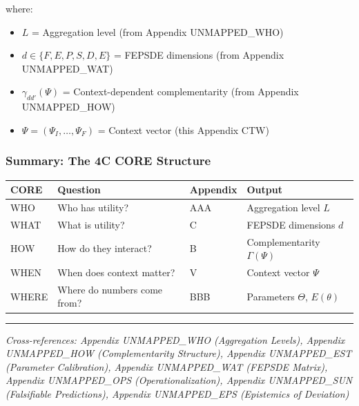 where:
\begin{itemize}
    \item $L$ = Aggregation level (from Appendix UNMAPPED_WHO)
    \item $d \in \{F, E, P, S, D, E\}$ = FEPSDE dimensions (from Appendix UNMAPPED_WAT)
    \item $\gamma_{dd'}(\Psi)$ = Context-dependent complementarity (from Appendix UNMAPPED_HOW)
    \item $\Psi = (\Psi_I, \ldots, \Psi_F)$ = Context vector (this Appendix CTW)
\end{itemize}

\subsubsection{Summary: The 4C CORE Structure}

\begin{center}
\begin{tabular}{llll}
\toprule
\textbf{CORE} & \textbf{Question} & \textbf{Appendix} & \textbf{Output} \\
\midrule
WHO & Who has utility? & AAA & Aggregation level $L$ \\
WHAT & What is utility? & C & FEPSDE dimensions $d$ \\
HOW & How do they interact? & B & Complementarity $\Gamma(\Psi)$ \\
WHEN & When does context matter? & V & Context vector $\Psi$ \\
WHERE & Where do numbers come from? & BBB & Parameters $\Theta$, $E(\theta)$ \\
\bottomrule
\end{tabular}
\end{center}

\vspace{0.5em}
\hrule
\vspace{0.5em}
\noindent\textit{Cross-references: Appendix UNMAPPED_WHO (Aggregation Levels), 
Appendix UNMAPPED_HOW (Complementarity Structure), Appendix UNMAPPED_EST (Parameter Calibration),
Appendix UNMAPPED_WAT (FEPSDE Matrix), Appendix UNMAPPED_OPS (Operationalization), 
Appendix UNMAPPED_SUN (Falsifiable Predictions), Appendix UNMAPPED_EPS (Epistemics of Deviation)}




